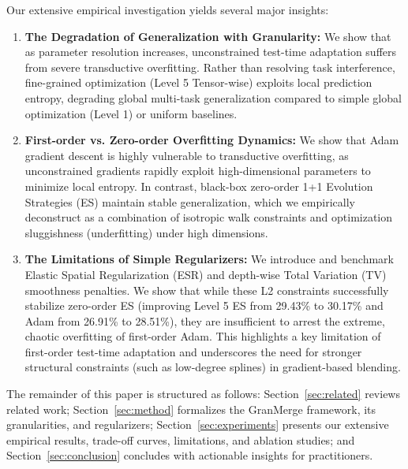 Our extensive empirical investigation yields several major insights:
\begin{enumerate}
    \item \textbf{The Degradation of Generalization with Granularity:} We show that as parameter resolution increases, unconstrained test-time adaptation suffers from severe transductive overfitting. Rather than resolving task interference, fine-grained optimization (Level 5 Tensor-wise) exploits local prediction entropy, degrading global multi-task generalization compared to simple global optimization (Level 1) or uniform baselines.
    \item \textbf{First-order vs. Zero-order Overfitting Dynamics:} We show that Adam gradient descent is highly vulnerable to transductive overfitting, as unconstrained gradients rapidly exploit high-dimensional parameters to minimize local entropy. In contrast, black-box zero-order 1+1 Evolution Strategies (ES) maintain stable generalization, which we empirically deconstruct as a combination of isotropic walk constraints and optimization sluggishness (underfitting) under high dimensions.
    \item \textbf{The Limitations of Simple Regularizers:} We introduce and benchmark Elastic Spatial Regularization (ESR) and depth-wise Total Variation (TV) smoothness penalties. We show that while these L2 constraints successfully stabilize zero-order ES (improving Level 5 ES from 29.43\% to 30.17\% and Adam from 26.91\% to 28.51\%), they are insufficient to arrest the extreme, chaotic overfitting of first-order Adam. This highlights a key limitation of first-order test-time adaptation and underscores the need for stronger structural constraints (such as low-degree splines) in gradient-based blending.
\end{enumerate}

The remainder of this paper is structured as follows: Section~\ref{sec:related} reviews related work; Section~\ref{sec:method} formalizes the GranMerge framework, its granularities, and regularizers; Section~\ref{sec:experiments} presents our extensive empirical results, trade-off curves, limitations, and ablation studies; and Section~\ref{sec:conclusion} concludes with actionable insights for practitioners.
